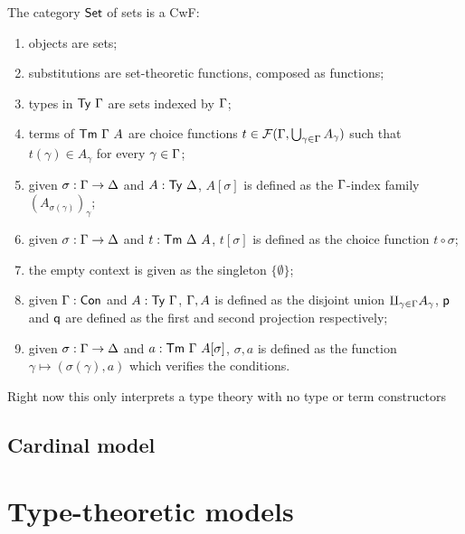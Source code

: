 The category \(\mathsf{Set}\) of sets is a \acrshort{CwF}:
\begin{enumerate}
  \item objects are sets;
  \item substitutions are set-theoretic functions, composed as functions;
  \item types in \(\mathsf{Ty}\ \Gamma\) are sets indexed by \(\Gamma\);
  \item terms of \(\mathsf{Tm}\ \Gamma\ A\) are choice functions
  \(t \in \mathcal{F}(\Gamma,\bigcup_{\gamma \in \Gamma} A_\gamma)\) such that
  \(t(\gamma) \in A_\gamma\) for every \(\gamma \in \Gamma\);
  \item given \(\sigma : \Gamma \to \Delta\) and \(A : \mathsf{Ty}\ \Delta\), \(A[\sigma]\)
  is defined as the \(\Gamma\)-index family \((A_{\sigma(\gamma)})_\gamma\);
  \item given \(\sigma : \Gamma \to \Delta\) and \(t : \mathsf{Tm}\ \Delta\ A\), \(t[\sigma]\)
  is defined as the choice function \(t \circ \sigma\);
  \item the empty context is given as the singleton \(\{ \emptyset \}\);
  \item given \(\Gamma : \mathsf{Con}\) and \(A : \mathsf{Ty}\ \Gamma\), \(\Gamma, A\) is defined as
  the disjoint union \(\amalg_{\gamma \in \Gamma} A_\gamma\), \(\mathsf{p}\) and \(\mathsf{q}\)
  are defined as the first and second projection respectively;
  \item given \(\sigma : \Gamma \to \Delta\) and \(a : \mathsf{Tm}\ \Gamma\ A[\sigma]\),
  \(\sigma, a\) is defined as the function
  \(\gamma \mapsto (\sigma(\gamma), a)\) which verifies the conditions.
\end{enumerate}

Right now this only interprets a type theory with no type or term constructors

\subsection{Cardinal model}

\section{Type-theoretic models}

